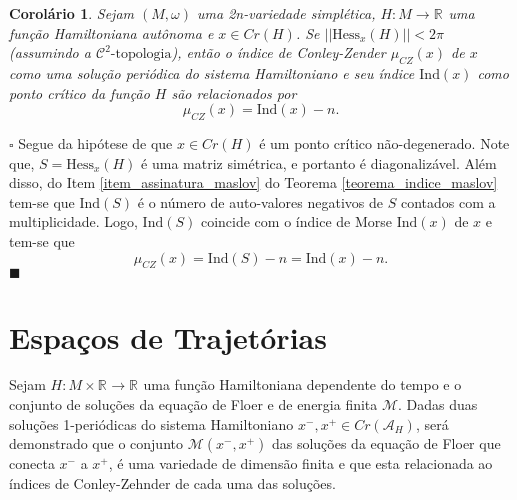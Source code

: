 \documentclass[12pt]{book}
\newtheorem{corolario}[teorema]{Corolário}
\newenvironment{prova}[1]{$\square$ #1}{\hfill$\blacksquare$}
\newcommand{\cktopologia}[1]{\mathcal{C}^{#1}\text{-topologia}}
\newcommand{\energiafinitaM}{\mathcal{M}}
\newcommand{\energiafinitaMconectante}{\energiafinitaM(x^{-}, x^{+})}
\newcommand{\funcionalH}{\mathcal{A}_{H}}
\newcommand{\hessianaponto}[2]{\text{Hess}_{#1}(#2)}
\newcommand{\iconley}[1]{\iconleyabrev(#1)}
\newcommand{\iconleyabrev}{\mu_{CZ}}
\newcommand{\ind}{\text{Ind}}
\newcommand{\norma}[1]{||#1||}
\newcommand{\pontoscriticos}[1]{\textit{Cr}(#1)}
\newcommand{\real}[1]{\mathbb{R}^{#1}}
\newcommand{\reta}{\real{}}
\begin{document}
	
	\begin{corolario}
		Sejam $(M,\omega)$ uma 2n-variedade simplética, $H:M\to \reta$ uma função Hamiltoniana autônoma e $x \in \pontoscriticos{H}$. Se $\norma{\hessianaponto{x}{H}}<2\pi$ (assumindo a $\cktopologia{2}$), então o índice de Conley-Zender $\iconley{x}$ de $x$ como uma solução periódica do sistema Hamiltoniano e seu índice $\ind(x)$ como ponto crítico da função $H$ são relacionados por
		$$
		\iconley{x} = \ind(x)-n.
		$$
	\end{corolario}
	\begin{prova}
		Segue da hipótese de que $x\in \pontoscriticos{H}$ é um ponto crítico não-degenerado. Note que, $S=\hessianaponto{x}{H}$ é uma matriz simétrica, e portanto é diagonalizável. Além disso, do Item \ref{item_assinatura_maslov} do Teorema \ref{teorema_indice_maslov} tem-se que $\ind(S)$ é o número de auto-valores negativos de $S$ contados com a multiplicidade. Logo, $\ind(S)$ coincide com o índice de Morse $\ind(x)$ de $x$ e tem-se que
		$$
		\iconley{x} = \ind(S)-n = \ind(x)-n.
		$$
	\end{prova}
	
	\chapter{Espaços de Trajetórias}\label{apendice_variedades_banach}
		
	Sejam $H:M\times \reta\to \reta$ uma função Hamiltoniana dependente do tempo e o conjunto de soluções da equação de Floer e de energia finita $\energiafinitaM$. Dadas duas soluções 1-periódicas do sistema Hamiltoniano $x^{-}, x^{+} \in \pontoscriticos{\funcionalH}$, será demonstrado que o conjunto $\energiafinitaMconectante$ das soluções da equação de Floer que conecta $x^{-}$ a $x^{+}$, é uma variedade de dimensão finita e que esta relacionada ao índices de Conley-Zehnder de cada uma das soluções.
	
\end{document}
